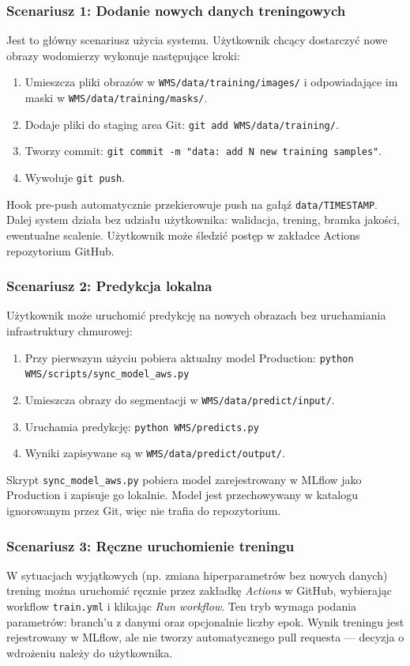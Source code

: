 \subsubsection{Scenariusz 1: Dodanie nowych danych treningowych}

Jest to główny scenariusz użycia systemu. Użytkownik chcący dostarczyć nowe obrazy wodomierzy wykonuje następujące kroki:

\begin{enumerate}
  \item Umieszcza pliki obrazów w \texttt{WMS/data/training/images/} i odpowiadające im maski w \texttt{WMS/data/training/masks/}.
  \item Dodaje pliki do staging area Git: \texttt{git add WMS/data/training/}.
  \item Tworzy commit: \texttt{git commit -m "data: add N new training samples"}.
  \item Wywołuje \texttt{git push}.
\end{enumerate}

Hook pre-push automatycznie przekierowuje push na gałąź \texttt{data/TIMESTAMP}. Dalej system działa bez udziału użytkownika: walidacja, trening, bramka jakości, ewentualne scalenie. Użytkownik może śledzić postęp w zakładce Actions repozytorium GitHub.

\subsubsection{Scenariusz 2: Predykcja lokalna}

Użytkownik może uruchomić predykcję na nowych obrazach bez uruchamiania infrastruktury chmurowej:

\begin{enumerate}
  \item Przy pierwszym użyciu pobiera aktualny model Production:
        \texttt{python WMS/scripts/sync\_model\_aws.py}
  \item Umieszcza obrazy do segmentacji w \texttt{WMS/data/predict/input/}.
  \item Uruchamia predykcję: \texttt{python WMS/predicts.py}
  \item Wyniki zapisywane są w \texttt{WMS/data/predict/output/}.
\end{enumerate}

Skrypt \texttt{sync\_model\_aws.py} pobiera model zarejestrowany w MLflow jako Production i zapisuje go lokalnie. Model jest przechowywany w katalogu ignorowanym przez Git, więc nie trafia do repozytorium.

\subsubsection{Scenariusz 3: Ręczne uruchomienie treningu}

W sytuacjach wyjątkowych (np. zmiana hiperparametrów bez nowych danych) trening można uruchomić ręcznie przez zakładkę \textit{Actions} w GitHub, wybierając workflow \texttt{train.yml} i klikając \textit{Run workflow}. Ten tryb wymaga podania parametrów: branch'u z danymi oraz opcjonalnie liczby epok. Wynik treningu jest rejestrowany w MLflow, ale nie tworzy automatycznego pull requesta --- decyzja o wdrożeniu należy do użytkownika.
